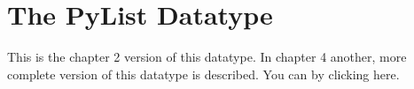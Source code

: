 \documentclass[letterpaper,10pt,english]{sphinxmanual}
\begin{document}
\begin{sphinxVerbatim}[commandchars=\\\{\},numbers=left,firstnumber=1,stepnumber=1]
    
   
\end{sphinxVerbatim}


\section{The PyList Datatype}
\label{\detokenize{chap2/chap2:the-pylist-datatype}}\label{\detokenize{chap2/chap2:pylist}}
This is the chapter 2 version of this datatype. In chapter 4 another, more complete version of this datatype is described. You can  by clicking here.
\end{document}
